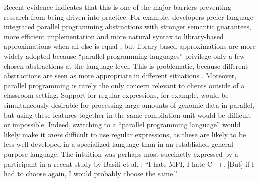 Recent evidence indicates that this is one of the major barriers preventing research from being driven into practice. For example, developers prefer language-integrated parallel programming abstractions with stronger semantic guarantees, more efficient implementation and more natural syntax to library-based approximations when all else is equal \cite{cave2010comparing}, but library-based approximations are more widely adopted because  ``parallel programming languages'' privilege only a few chosen  abstractions at the language level. This is problematic, because different abstractions are seen as more appropriate in different situations \cite{Tasharofi:2013rc}. Moreover,  parallel programming is rarely the only concern relevant to clients outside of a classroom setting. Support for regular expressions, for example, would be simultaneously desirable for processing large amounts of genomic data in parallel, but using these features together in the same compilation unit would be difficult or impossible. Indeed, switching to a ``parallel programming language'' would likely make it \emph{more} difficult to use regular expressions, as these are likely to be less well-developed in a specialized language than in an established general-purpose language. The intuition was perhaps most succinctly expressed by a participant in a recent study by Basili et al. \cite{basili2008understanding}:  ``I hate MPI, I hate C++. [But] if I had to choose again, I would probably choose the same.'' %




